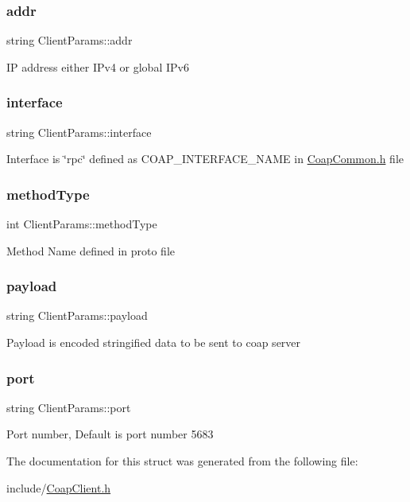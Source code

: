 \subsubsection{\texorpdfstring{addr}{addr}}
{\footnotesize\ttfamily string Client\+Params\+::addr}

IP address either I\+Pv4 or global I\+Pv6 \mbox{\label{structClientParams_a6af6f3817ebf9ed3f7d9378e6a23a59e}} 
\subsubsection{\texorpdfstring{interface}{interface}}
{\footnotesize\ttfamily string Client\+Params\+::interface}

Interface is \char`\"{}rpc\char`\"{} defined as C\+O\+A\+P\+\_\+\+I\+N\+T\+E\+R\+F\+A\+C\+E\+\_\+\+N\+A\+ME in \hyperlink{CoapCommon_8h}{Coap\+Common.\+h} file \mbox{\label{structClientParams_aa40f37f1eeb3ed6cff8a76e92a7e9bd1}} 
\subsubsection{\texorpdfstring{method\+Type}{methodType}}
{\footnotesize\ttfamily int Client\+Params\+::method\+Type}

Method Name defined in proto file \mbox{\label{structClientParams_aa16d76f3cbdfa5bfd4e54bcdb9a25737}} 
\subsubsection{\texorpdfstring{payload}{payload}}
{\footnotesize\ttfamily string Client\+Params\+::payload}

Payload is encoded stringified data to be sent to coap server \mbox{\label{structClientParams_ade2b9a6084d6b1989c3440fe2cd60fdb}} 
\subsubsection{\texorpdfstring{port}{port}}
{\footnotesize\ttfamily string Client\+Params\+::port}

Port number, Default is port number 5683 

The documentation for this struct was generated from the following file\+:\begin{DoxyCompactItemize}
\item 
include/\hyperlink{CoapClient_8h}{Coap\+Client.\+h}\end{DoxyCompactItemize}
